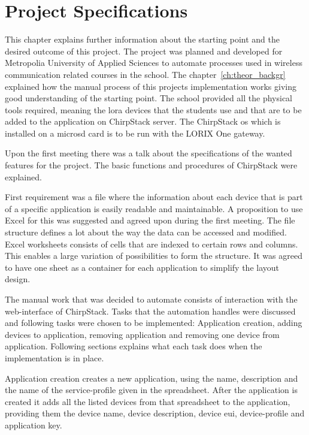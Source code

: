 
\chapter{Project Specifications} \label{ch:project_spec}
This chapter explains further information about the starting point and the desired outcome of this project.
The project was planned and developed for Metropolia University of Applied Sciences to automate processes used in wireless communication related courses in the school.
The chapter~\ref{ch:theor_backgr} explained how the manual process of this projects implementation works giving good understanding of the starting point.
The school provided all the physical tools required, meaning the \gls{lora} devices that the students use and that are to be added to the application on ChirpStack server.
The ChirpStack \gls{os} which is installed on a micro\gls{sd} card is to be run with the LORIX One gateway.

Upon the first meeting there was a talk about the specifications of the wanted features for the project.
The basic functions and procedures of ChirpStack were explained.

First requirement was a file where the information about each device that is part of a specific application is easily readable and maintainable.
A proposition to use Excel for this was suggested and agreed upon during the first meeting.
The file structure defines a lot about the way the data can be accessed and modified.
Excel worksheets consists of cells that are indexed to certain rows and columns.
This enables a large variation of possibilities to form the structure.
It was agreed to have one sheet as a container for each application to simplify the layout design.

The manual work that was decided to automate consists of interaction with the web-interface of ChirpStack.
Tasks that the automation handles were discussed and following tasks were chosen to be implemented: Application creation, adding devices to application, removing application and removing one device from application.
Following sections explains what each task does when the implementation is in place.

Application creation creates a new application, using the name, description and the name of the service-profile given in the spreadsheet.
After the application is created it adds all the listed devices from that spreadsheet to the application, providing them the device name, device description, device \gls{eui}, device-profile and application key.

